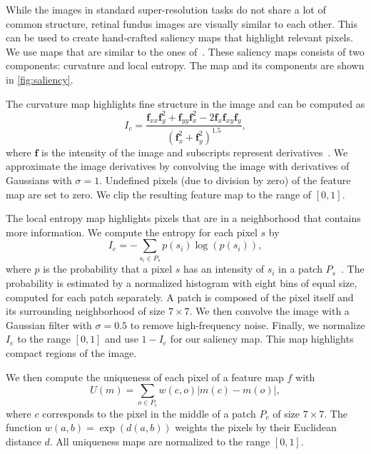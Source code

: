 \documentclass{scrartcl}
\newcommand{\img}{\bm{f}} %
\begin{document}
While the images in standard super-resolution tasks do not share a lot of common structure, retinal fundus images are visually similar to each other.
This can be used to create hand-crafted saliency maps that highlight relevant pixels.
We use maps that are similar to the ones of~\cite{SaliencyGAN}.
These saliency maps consists of two components: curvature and local entropy.
The map and its components are shown in \cref{fig:saliency}.

The curvature map highlights fine structure in the image and can be computed as
\begin{equation}
 I_c = \frac{\img_{xx} \img_y^2 + \img_{yy} \img_x^2 - 2 \img_{x} \img_{xy} \img_{y} }{(\img_x^2 + \img_y^2)^{1.5}},
\end{equation}
where \(\img\) is the intensity of the image and subscripts represent derivatives~\cite{SaliencyGAN}.
We approximate the image derivatives by convolving the image with derivatives of Gaussians with \(\sigma = 1\).
Undefined pixels (due to division by zero) of the feature map are set to zero.
We clip the resulting feature map to the range of $[0,1]$.

The local entropy map highlights pixels that are in a neighborhood that contains more information.
We compute the entropy for each pixel $s$ by
\begin{equation}
  \label{eq:entr}
  I_e = - \sum_{s_i \in P_s} p(s_i) \log(p(s_i)),
\end{equation}
where \(p\) is the probability that a pixel \(s\) has an intensity of \(s_i\) in a patch \(P_s\)~\cite{SaliencyGAN}.
The probability is estimated by a normalized histogram with eight bins of equal size, computed for each patch separately.
A patch is composed of the pixel itself and its surrounding neighborhood of size \(7 \times 7\).
We then convolve the image with a Gaussian filter with \(\sigma = 0.5\) to remove high-frequency noise.
Finally, we normalize $I_e$ to the range \([0, 1]\) and use $1 - I_e$ for our saliency map.
This map highlights compact regions of the image.

We then compute the uniqueness of each pixel of a feature map \(f\) with
\begin{equation}
  \label{eq:uniq}
  U(m) = \sum_{o \in P_c} w(c, o) \vert m(c) - m(o) \vert,
\end{equation}
where \(c\) corresponds to the pixel in the middle of a patch \(P_c\) of size \(7 \times 7\).
The function \(w(a,b) = \exp\left(d(a, b)\right)\) weights the pixels by their Euclidean distance \(d\).
All uniqueness maps are normalized to the range \([0,1]\).
\end{document}
